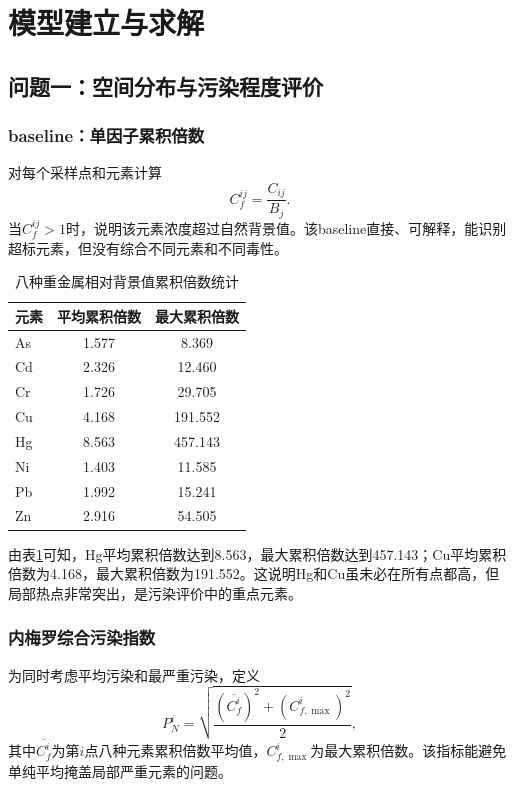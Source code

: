 \documentclass[UTF8,a4paper,12pt]{ctexart}
\begin{document}
\section{模型建立与求解}
\subsection{问题一：空间分布与污染程度评价}
\subsubsection{baseline：单因子累积倍数}
对每个采样点和元素计算
\begin{equation}
C_f^{ij}=\frac{C_{ij}}{B_j} .
\end{equation}
当$C_f^{ij}>1$时，说明该元素浓度超过自然背景值。该baseline直接、可解释，能识别超标元素，但没有综合不同元素和不同毒性。

\begin{table}[H]
\centering
\caption{八种重金属相对背景值累积倍数统计}
\label{tab:cf}
\begin{tabular}{lcc}
\toprule
元素 & 平均累积倍数 & 最大累积倍数 \\
\midrule
As & 1.577 & 8.369 \\
Cd & 2.326 & 12.460 \\
Cr & 1.726 & 29.705 \\
Cu & 4.168 & 191.552 \\
Hg & 8.563 & 457.143 \\
Ni & 1.403 & 11.585 \\
Pb & 1.992 & 15.241 \\
Zn & 2.916 & 54.505 \\
\bottomrule
\end{tabular}
\end{table}

由表\ref{tab:cf}可知，Hg平均累积倍数达到8.563，最大累积倍数达到457.143；Cu平均累积倍数为4.168，最大累积倍数为191.552。这说明Hg和Cu虽未必在所有点都高，但局部热点非常突出，是污染评价中的重点元素。

\subsubsection{内梅罗综合污染指数}
为同时考虑平均污染和最严重污染，定义
\begin{equation}
P_N^i=\sqrt{\frac{(\overline{C_f^i})^2+(C_{f,\max}^i)^2}{2}},
\end{equation}
其中$\overline{C_f^i}$为第$i$点八种元素累积倍数平均值，$C_{f,\max}^i$为最大累积倍数。该指标能避免单纯平均掩盖局部严重元素的问题。
\end{document}
